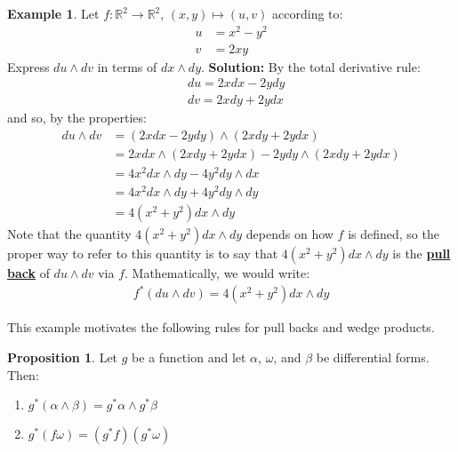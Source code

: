 \documentclass[11pt]{scrartcl}
\newcommand{\R}[0]{\mathbb{R}}
\theoremstyle{definition}
\newtheorem{prop}{Proposition}
\newtheorem{ex}{Example}
\theoremstyle{remark}
\newcommand{\dfn}[1]{\textbf{\underline{#1}}}
\begin{document}
{\begin{ex}
	Let $f: \R^2 \rightarrow \R^2$, $(x,y) \mapsto (u,v)$ according to: 
	\begin{align*}
		 u & = x^2 - y^2 \\
		v & = 2xy 
	\end{align*}
	Express $du \wedge dv$ in terms of $dx \wedge dy$. 
	\newline
	\textbf{Solution:} By the total derivative rule: 
	\begin{align*}
		& du = 2x dx - 2y dy \\
		& dv = 2x dy + 2y dx 
	\end{align*}
	and so, by the properties: 
	\begin{align*}
		du \wedge dv & = (2x dx - 2ydy ) \wedge (2x dy + 2y dx) \\
					 & = 2x dx \wedge (2x dy + 2y dx) - 2y dy \wedge (2x dy + 2ydx) \\
					 & = 4x^2 dx \wedge dy - 4y^2 dy \wedge dx \\
					 & = 4x^2 dx \wedge dy + 4y^2 dy \wedge dy \\
					 & = 4(x^2 + y^2) dx \wedge dy 
	\end{align*}
	Note that the quantity $ 4(x^2 + y^2) dx \wedge dy $ depends on how $f$ is defined, so the proper way to refer to this quantity is to say that $ 4(x^2 + y^2) dx \wedge dy $ is the \dfn{pull back} of $du \wedge dv$ via $f$. Mathematically, we would write: 
	\begin{align*}
		f^*(du \wedge dv) = 4(x^2 + y^2) dx \wedge dy 
	\end{align*}
\end{ex}

This example motivates the following rules for pull backs and wedge products. 

\begin{prop}
	Let $g$ be a function and let $\alpha$, $\omega$, and $\beta$ be differential forms. Then: 
	\begin{enumerate}[noitemsep]
		\item $g^*(\alpha \wedge \beta) = g^* \alpha \wedge g^* \beta$ 
		\item $g^*(f \omega) = (g^* f) (g^* \omega) $
	\end{enumerate}
\end{prop}



}
\end{document}
